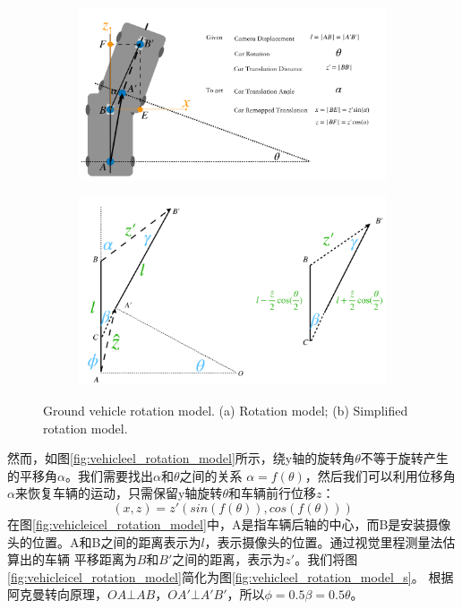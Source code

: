 \begin{figure}[ht]
    \centering
    \begin{subfigure}[b]{0.45\textwidth}
        \includegraphics[width=\textwidth]{datavo/vehicle_rotation_1-crop.pdf}
        \caption{}
        \label{fig:vehicel_rotation_model} 
    \end{subfigure}
    \begin{subfigure}[b]{0.45\textwidth}
        \includegraphics[width=\textwidth]{datavo/vehicle_rotation_2-crop.pdf}
        \caption{}
        \label{fig:vehicel_rotation_model_s} 
    \end{subfigure}
    \caption{Ground vehicle rotation model. (a) Rotation model; (b) Simplified rotation model.}
    \label{fig:rotation_model}
\end{figure}

然而，如图\ref{fig:vehicleel_rotation_model}所示，绕y轴的旋转角$\theta$不等于旋转产生的平移角$\alpha$。我们需要找出$\alpha$和$\theta$之间的关系
$\alpha=f(\theta)$，然后我们可以利用位移角$\alpha$来恢复车辆的运动，只需保留y轴旋转$\theta$和车辆前行位移$z$：
\begin{equation}
    (x,z) = z'(sin(f(\theta)),cos(f(\theta)))
    \label{eq:car_angle}
\end{equation}
在图\ref{fig:vehicleicel_rotation_model}中，A是指车辆后轴的中心，而B是安装摄像头的位置。A和B之间的距离表示为$l$，表示摄像头的位置。通过视觉里程测量法估算出的车辆
平移距离为$B$和$B'$之间的距离，表示为$z'$。我们将图\ref{fig:vehicleicel_rotation_model}简化为图\ref{fig:vehicleel_rotation_model_s}。
根据阿克曼转向原理\cite{siegwart2011introduction}，$OA\bot AB$，$OA'\bot A'B'$，所以$\phi=0.5 \beta=0.5 \theta$。

